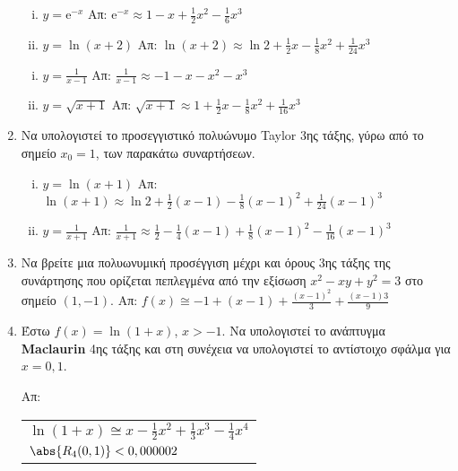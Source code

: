 \documentclass[a4paper,table]{report}
\newcommand{\twocolumnsidesss}[2]{\begin{minipage}[t]{0.52\linewidth}\raggedright
        #1
        \end{minipage}\hspace{2pt}\hfill{\color{Col1}{\vrule width 1pt}}\hfill\begin{minipage}[t]{0.47\linewidth}\raggedright
        #2
    \end{minipage}
}
\begin{document}
\begin{enumerate}
    \twocolumnsidesss{
      \begin{enumerate}[i)]
        \item $ y= \mathrm{e}^{-x} $ 
          \hfill Απ: $ \mathrm{e}^{-x} \approx 1-x+ \frac{1}{2} x^{2} - \frac{1}{6} x^{3} $ 
        \item $ y= \ln{(x+2)} $ \;
          \hfill Απ: $ \ln{(x+2)} \approx \ln{2} + \frac{1}{2} x - \frac{1}{8} x^{2} +
          \frac{1}{24} x^{3} $ 
      \end{enumerate}
    }{
      \begin{enumerate}[i),start=3]
        \item $ y= \frac{1}{x-1} $ \hfill Απ: $ \frac{1}{x-1} \approx -1 -x -x^{2} - x^{3} $ 
        \item $ y= \sqrt{x+1} $ \hfill Απ: $ \sqrt{x+1} \approx 1 + \frac{1}{2} x -
          \frac{1}{8} x^{2} + \frac{1}{16} x^{3} $ 
      \end{enumerate}
    }

  \item  Να υπολογιστεί το προσεγγιστικό πολυώνυμο Taylor 3ης τάξης, γύρω από 
    το σημείο $ x_{0}=1 $, των παρακάτω συναρτήσεων.
    \begin{enumerate}[i)]
      \item $ y= \ln{(x+1)} $ 
        \hfill Απ: $ \ln{(x+1)} \approx \ln{2} + \frac{1}{2} (x-1) - \frac{1}{8}
        (x-1)^{2} + \frac{1}{24} (x-1)^{3} $ 
      \item $ y= \frac{1}{x+1} $ \hfill Απ: $ \frac{1}{x+1} \approx \frac{1}{2} -
        \frac{1}{4} (x-1) + \frac{1}{8} (x-1)^{2} - \frac{1}{16} (x-1)^{3} $ 
    \end{enumerate}

  \item Να βρείτε μια πολυωνυμική προσέγγιση μέχρι και 
    όρους 3ης τάξης της συνάρτησης που ορίζεται πεπλεγμένα από την εξίσωση 
    $ x^{2} - xy + y^{2} = 3$ στο σημείο $ (1,-1) $.
    \hfill Απ: $f(x) \cong -1 + (x-1) + \frac{(x-1)^{2}}{3} + \frac{(x-1){3}}{9}$

    \item Έστω $ f(x) = \ln{(1+x)} $, $ x>-1 $. Να υπολογιστεί το ανάπτυγμα
      \textbf{Maclaurin} 4ης τάξης και στη συνέχεια να υπολογιστεί το αντίστοιχο 
      σφάλμα για $ x = 0,1 $.

      \hfill Απ: \begin{tabular}{l}
        $ \ln(1+x) \cong x - \frac{1}{2} x^{2} + \frac{1}{3}x^{3} - 
        \frac{1}{4} x^{4} $ \\ 
        $ \abs{R_{4}(0,1)} < 0,000002$	
      \end{tabular}

\end{enumerate}
\end{document}
